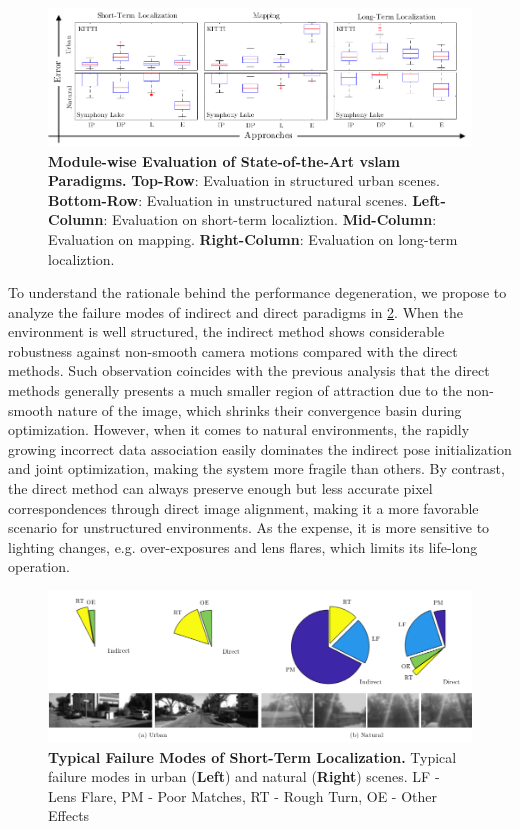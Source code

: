 \begin{figure}[t]
    \centering
	\includegraphics[width=1.0\textwidth]{figures/intro/compareMethods.pdf}
	\caption[Module-wise Evaluation of State-of-the-Art \acrshort{vslam} Paradigms]{\textbf{Module-wise Evaluation of State-of-the-Art \acrshort{vslam} Paradigms.} \textbf{Top-Row}: Evaluation in structured urban scenes. \textbf{Bottom-Row}: Evaluation in unstructured natural scenes. \textbf{Left-Column}: Evaluation on short-term localiztion. \textbf{Mid-Column}: Evaluation on mapping. \textbf{Right-Column}: Evaluation on long-term localiztion.
	\label{fig:intro_gaps}}
\end{figure}


To understand the rationale behind the performance degeneration, we propose to analyze the failure modes of indirect and direct paradigms in \ref{fig:intro_vofailures}. 
When the environment is well structured, the indirect method shows considerable robustness against non-smooth camera motions compared with the direct methods. 
Such observation coincides with the previous analysis that the direct methods generally presents a much smaller region of attraction due to the non-smooth nature of the image, which shrinks their convergence basin during optimization. 
However, when it comes to natural environments, the rapidly growing incorrect data association easily dominates the indirect pose initialization and joint optimization, making the system more fragile than others.  
By contrast, the direct method can always preserve enough but less accurate pixel correspondences through direct image alignment, making it a more favorable scenario for unstructured environments. 
As the expense, it is more sensitive to lighting changes, e.g. over-exposures and lens flares, which limits its life-long operation.

\begin{figure}[t]
    \centering
	\includegraphics[width=1.0\textwidth]{figures/intro/vofailures.pdf}
	\caption[Typical Failure Modes of Short-Term Localization]{\textbf{Typical Failure Modes of Short-Term Localization.} Typical failure modes in urban (\textbf{Left}) and natural (\textbf{Right}) scenes. LF - Lens Flare, PM - Poor Matches, RT - Rough Turn, OE - Other Effects
	\label{fig:intro_vofailures}}
\end{figure}

